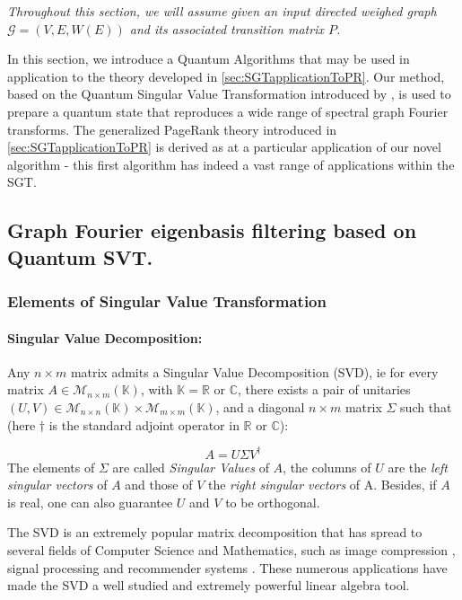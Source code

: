 \documentclass{article}
\begin{document}
\textit{Throughout this section, we will assume given an input directed weighed graph $\mathcal{G}=(V,E,W(E))$ and its associated transition matrix $P$.}

In this section, we introduce a Quantum Algorithms that may be used in application to the theory developed in \ref{sec:SGTapplicationToPR}.
Our method, based on the Quantum Singular Value Transformation introduced by \cite{gilyén_su_low_wiebe_2019}, is used to prepare a quantum state that reproduces a wide range of spectral graph Fourier transforms. The generalized PageRank theory introduced in \ref{sec:SGTapplicationToPR} is derived as at a particular application of our novel algorithm - this first algorithm has indeed a vast range of applications within the SGT.
    
\subsection{Graph Fourier eigenbasis filtering based on Quantum SVT.}

\subsubsection{Elements of Singular Value Transformation}
\paragraph{Singular Value Decomposition:}
Any $n\times m$ matrix admits a Singular Value Decomposition (SVD), ie for every matrix $A \in \mathcal{M}_{n\times m}(\mathbb{K})$, with $\mathbb{K} = \mathbb{R}$ or $\mathbb{C}$, there exists a pair of unitaries $(U,V)\in \mathcal{M}_{n\times n}(\mathbb{K}) \times \mathcal{M}_{m\times m}(\mathbb{K})$, and a diagonal $n \times m$ matrix $\Sigma$ such that (here $\dagger$ is the standard adjoint operator in $\mathbb{R}$ or $\mathbb{C}$):

\begin{equation}
    A = U \Sigma V^\dagger
\end{equation}
The elements of $\Sigma$ are called \textit{Singular Values} of $A$, the columns of $U$ are the \textit{left singular vectors} of $A$ and those of $V$ the \textit{right singular vectors} of A. Besides, if $A$ is real, one can also guarantee $U$ and $V$ to be orthogonal.

The SVD is an extremely popular matrix decomposition that has spread to several fields of Computer Science and Mathematics, such as image compression \cite{image_compression_svd}, signal processing \cite{alter_brown_botstein_2000} and recommender systems \cite{fang_guo_ding_lan_2014}. These numerous applications have made the SVD a well studied and extremely powerful linear algebra tool. 
\end{document}
